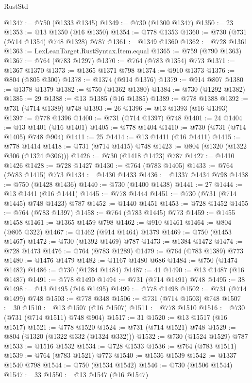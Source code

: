\begin{lexlean}{RustStd}
\begin{coremodule}
@1347 := @750 (@1333 @1345)
@1349 := @730 (@1300 @1347)
@1350 := 23
@1353 := @13 @1350 (@16 @1350)
@1354 := @778 @1353
@1360 := @730 (@731 (@714 @1354) @748 @1328) @787
@1361 := @1349 @1360
@1362 := @728 @1361
@1363 := LexLeanTarget.RustSyntax.Item.equal
@1365 := @759 (@790 @1363)
@1367 := @764 (@783 @1297)
@1370 := @764 (@783 @1354) @773
@1371 := @1367 @1370
@1373 := @1365 @1371 @798
@1374 := @910 @1373
@1376 := @804 (@805 @300)
@1378 := @1374 (@914 @1376)
@1379 := @914 @807
@1380 := @1378 @1379
@1382 := @750 (@1362 @1380)
@1384 := @730 (@1292 @1382)
@1385 := 29
@1388 := @13 @1385 (@16 @1385)
@1389 := @778 @1388
@1392 := @731 (@714 @1389) @748
@1393 := 26
@1396 := @13 @1393 (@16 @1393)
@1397 := @778 @1396
@1400 := @731 (@714 @1397) @748
@1401 := 24
@1404 := @13 @1401 (@16 @1401)
@1405 := @778 @1404
@1410 := @730 (@731 (@714 @1405) @748 @904)
@1411 := 25
@1414 := @13 @1411 (@16 @1411)
@1415 := @778 @1414
@1418 := @731 (@714 @1415) @748
@1423 := @804 (@1320 (@1322 @306 (@1324 @306)))
@1426 := @730 (@1418 @1423) @787
@1427 := @1410 @1426
@1428 := @728 @1427
@1430 := @764 (@783 @1405)
@1433 := @764 (@783 @1415) @773
@1434 := @1430 @1433
@1436 := @1337 @1434 @798
@1438 := @750 (@1428 @1436)
@1440 := @730 (@1400 @1438)
@1441 := 27
@1444 := @13 @1441 (@16 @1441)
@1445 := @778 @1444
@1451 := @730 (@731 (@714 @1445) @748 @1423) @787
@1452 := @1440 @1451
@1453 := @728 @1452
@1455 := @764 (@783 @1397)
@1458 := @764 (@783 @1445) @773
@1459 := @1455 @1458
@1461 := @1365 @1459 @798
@1462 := @910 @1461
@1464 := @804 (@805 @322)
@1467 := @1462 (@914 @1464) @1379
@1469 := @750 (@1453 @1467)
@1472 := @730 (@1392 @1469) @787
@1473 := @1384 @1472
@1474 := @728 @1473
@1476 := @764 (@783 @1289)
@1479 := @764 (@783 @1389) @773
@1480 := @1476 @1479
@1482 := @1167 @1480 @686
@1484 := @750 (@1474 @1482)
@1486 := @730 (@1284 @1484)
@1487 := 41
@1490 := @13 @1487 (@16 @1487)
@1491 := @778 @1490
@1494 := @731 (@714 @1491) @748
@1495 := 38
@1498 := @13 @1495 (@16 @1495)
@1499 := @778 @1498
@1502 := @731 (@714 @1499) @748
@1503 := @778 @348
@1506 := @731 (@714 @1503) @748
@1507 := 30
@1510 := @13 @1507 (@16 @1507)
@1511 := @778 @1510
@1516 := @730 (@731 (@714 @1511) @748 @904)
@1517 := 31
@1520 := @13 @1517 (@16 @1517)
@1521 := @778 @1520
@1524 := @731 (@714 @1521) @748
@1529 := @804 (@1320 (@1322 @332 (@1324 @332)))
@1532 := @730 (@1524 @1529) @787
@1533 := @1516 @1532
@1534 := @728 @1533
@1536 := @764 (@783 @1511)
@1539 := @764 (@783 @1521) @773
@1540 := @1536 @1539
@1542 := @1337 @1540 @798
@1544 := @750 (@1534 @1542)
@1546 := @730 (@1506 @1544)
@1547 := 33
@1550 := @13 @1547 (@16 @1547)

\end{coremodule}
\end{lexlean}
